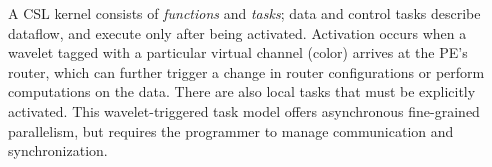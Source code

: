 \documentclass[sigconf]{acmart}
\begin{document}
    A CSL kernel consists of \textit{functions} and \textit{tasks}; data and control tasks describe dataflow, and execute only after being activated. %
    Activation occurs when a wavelet tagged with a particular virtual channel (color) arrives at the PE’s router, which can further trigger a change in router configurations or perform computations on the data. %
    There are also local tasks that must be explicitly activated. %
    This wavelet-triggered task model offers %
    asynchronous fine-grained parallelism, but requires the programmer to manage communication and synchronization. %
    
\end{document}
